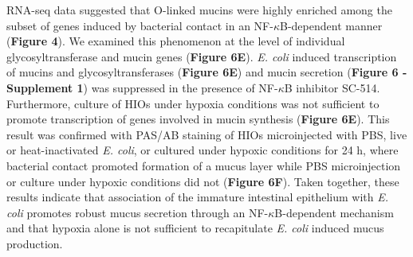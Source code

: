 \documentclass[9pt,lineo]{elife}
\begin{document}
RNA-seq data suggested that O-linked mucins were highly enriched among the subset of genes induced by bacterial contact in an NF-\(\kappa\)B-dependent manner (\textbf{Figure 4}). We examined this phenomenon at the level of individual glycosyltransferase and mucin genes (\textbf{Figure 6E}). \emph{E. coli} induced transcription of mucins and glycosyltransferases (\textbf{Figure 6E}) and mucin secretion (\textbf{Figure 6 - Supplement 1})  was suppressed in the presence of NF-\(\kappa\)B inhibitor SC-514. Furthermore, culture of HIOs under hypoxia conditions was not sufficient to promote transcription of genes involved in mucin synthesis (\textbf{Figure 6E}). This result was confirmed with PAS/AB staining of HIOs microinjected with PBS, live or heat-inactivated \emph{E. coli}, or cultured under hypoxic conditions for 24 h, where bacterial contact promoted formation of a mucus layer while PBS microinjection or culture under hypoxic conditions did not (\textbf{Figure 6F}). Taken together, these results indicate that association of the immature intestinal epithelium with \emph{E. coli} promotes robust mucus secretion through an NF-\(\kappa\)B-dependent mechanism and that hypoxia alone is not sufficient to recapitulate \emph{E. coli} induced mucus production.
\end{document}
